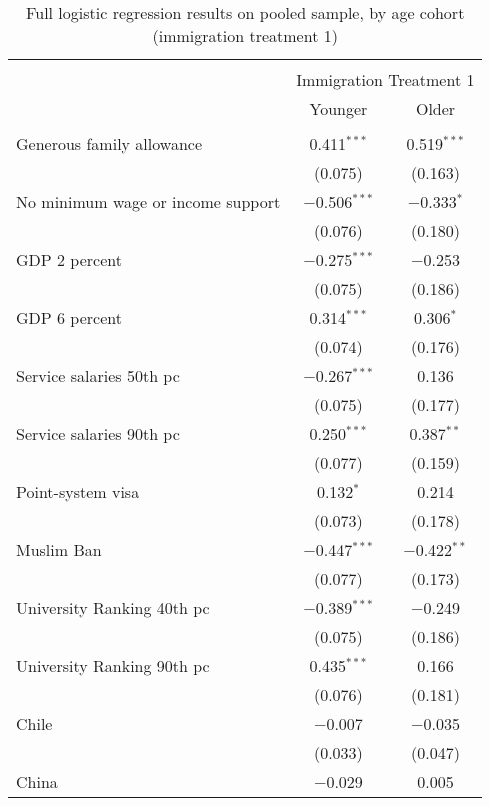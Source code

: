 
\begin{table}[!htbp] \centering 
  \caption{Full logistic regression results on pooled sample, by age cohort (immigration treatment 1)} 
  \label{tab:age_full_1} 
\footnotesize 
\begin{tabular}{@{\extracolsep{5pt}}lcc} 
\\[-1.8ex]\hline 
\hline \\[-1.8ex] 
 & \multicolumn{2}{c}{Immigration Treatment 1} \\ 
\cline{2-3} 
 & Younger & Older \\ 
\hline \\[-1.8ex] 
 Generous family allowance & 0.411$^{***}$ & 0.519$^{***}$ \\ 
  & (0.075) & (0.163) \\ 
  No minimum wage or income support & $-$0.506$^{***}$ & $-$0.333$^{*}$ \\ 
  & (0.076) & (0.180) \\ 
  GDP 2 percent & $-$0.275$^{***}$ & $-$0.253 \\ 
  & (0.075) & (0.186) \\ 
  GDP 6 percent & 0.314$^{***}$ & 0.306$^{*}$ \\ 
  & (0.074) & (0.176) \\ 
  Service salaries 50th pc & $-$0.267$^{***}$ & 0.136 \\ 
  & (0.075) & (0.177) \\ 
  Service salaries 90th pc & 0.250$^{***}$ & 0.387$^{**}$ \\ 
  & (0.077) & (0.159) \\ 
  Point-system visa & 0.132$^{*}$ & 0.214 \\ 
  & (0.073) & (0.178) \\ 
  Muslim Ban & $-$0.447$^{***}$ & $-$0.422$^{**}$ \\ 
  & (0.077) & (0.173) \\ 
  University Ranking 40th pc & $-$0.389$^{***}$ & $-$0.249 \\ 
  & (0.075) & (0.186) \\ 
  University Ranking 90th pc & 0.435$^{***}$ & 0.166 \\ 
  & (0.076) & (0.181) \\ 
  Chile & $-$0.007 & $-$0.035 \\ 
  & (0.033) & (0.047) \\ 
  China & $-$0.029 & 0.005 \\ 

\end{tabular}
\end{table}
